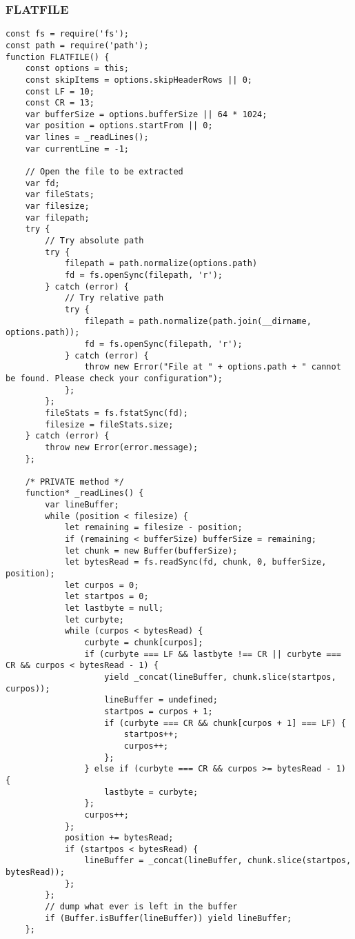 \subsubsection{FLATFILE}
\label{netl-extract-flatfile}
\begin{verbatim}
const fs = require('fs');
const path = require('path');
function FLATFILE() {
    const options = this;
    const skipItems = options.skipHeaderRows || 0;
    const LF = 10;
    const CR = 13;
    var bufferSize = options.bufferSize || 64 * 1024;
    var position = options.startFrom || 0;
    var lines = _readLines();
    var currentLine = -1;

    // Open the file to be extracted
    var fd;
    var fileStats;
    var filesize;
    var filepath;
    try {
        // Try absolute path
        try {
            filepath = path.normalize(options.path)
            fd = fs.openSync(filepath, 'r');
        } catch (error) {
            // Try relative path
            try {
                filepath = path.normalize(path.join(__dirname, options.path));
                fd = fs.openSync(filepath, 'r');
            } catch (error) {
                throw new Error("File at " + options.path + " cannot be found. Please check your configuration");
            };
        };
        fileStats = fs.fstatSync(fd);
        filesize = fileStats.size;
    } catch (error) {
        throw new Error(error.message);
    };

    /* PRIVATE method */
    function* _readLines() {
        var lineBuffer;
        while (position < filesize) {
            let remaining = filesize - position;
            if (remaining < bufferSize) bufferSize = remaining;
            let chunk = new Buffer(bufferSize);
            let bytesRead = fs.readSync(fd, chunk, 0, bufferSize, position);
            let curpos = 0;
            let startpos = 0;
            let lastbyte = null;
            let curbyte;
            while (curpos < bytesRead) {
                curbyte = chunk[curpos];
                if (curbyte === LF && lastbyte !== CR || curbyte === CR && curpos < bytesRead - 1) {
                    yield _concat(lineBuffer, chunk.slice(startpos, curpos));
                    lineBuffer = undefined;
                    startpos = curpos + 1;
                    if (curbyte === CR && chunk[curpos + 1] === LF) {
                        startpos++;
                        curpos++;
                    };
                } else if (curbyte === CR && curpos >= bytesRead - 1) {
                    lastbyte = curbyte;
                };
                curpos++;
            };
            position += bytesRead;
            if (startpos < bytesRead) {
                lineBuffer = _concat(lineBuffer, chunk.slice(startpos, bytesRead));
            };
        };
        // dump what ever is left in the buffer
        if (Buffer.isBuffer(lineBuffer)) yield lineBuffer;
    };


\end{verbatim}
